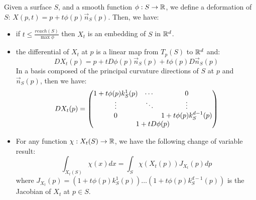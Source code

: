 \begin{lemma}
    \label{lemma:deformation}

    Given a surface $ S $, and a smooth function $ \phi : S \to \mathbb{R} $, we define a
    deformation of $ S $: $ X(p, t) = p + t \phi(p) \vec{n}_S(p) $. Then, we
    have:

    \begin{itemize}
        \item if $ t \leq \frac{reach(S)}{\max \phi} $ then $ X_t $ is an
            embedding of $ S $ in $ \mathbb{R}^d $.
        \item the differential of $ X_t $ at $ p $ is a linear map from $ T_p(S)
            $ to $ \mathbb{R}^d $ and:
            \begin{equation}
                D X_t(p) = p + t D \phi(p) \vec{n}_S(p) + t \phi(p) D \vec{n}_S(p)
            \end{equation}
            In a basis composed of the principal curvature directions of $ S $
            at $ p $ and $ \vec{n}_S(p) $, then we have:
            \begin{equation}
                D X_t(p) =
                \begin{pmatrix}
                    1 + t \phi(p) k^1_S(p) & \cdots & 0 \\
                    \vdots                 & \ddots & \vdots                      \\
                    0                      &        & 1 + t \phi(p) k^{d-1}_S(p)  \\
                    \multicolumn{3}{c}{1 + t D\phi(p)} \\
                \end{pmatrix}
            \end{equation}
        \item For any function $ \chi : X_t(S) \to \mathbb{R} $, we have the following
            change of variable result:
            \begin{equation}
                \int_{X_t(S)} \chi(x) dx = \int_S \chi(X_t(p)) J_{X_t}(p) dp
            \end{equation}
            where $ J_{X_t}(p) = (1 + t \phi(p) k^1_S(p)) \hdots (1 + t \phi(p)
            k^{d-1}_S(p)) $ is the Jacobian of $ X_t $ at $ p \in S $.
    \end{itemize}
\end{lemma}

